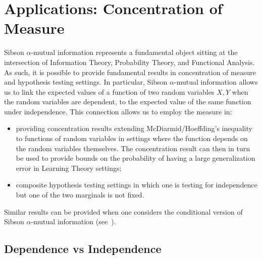 \documentclass{article}
\numberwithin{theorem}{section}
\numberwithin{example}{section}
\numberwithin{remark}{section}
\numberwithin{definition}{section}
\begin{document}
\section{Applications: Concentration of Measure}\label{sec:concentration}
Sibson $\alpha$-mutual information represents a fundamental object sitting at the intersection of Information Theory, Probability Theory, and Functional Analysis. As such, it is possible to provide fundamental results in concentration of measure and hypothesis testing settings. In particular, Sibson $\alpha$-mutual information allows us to link the expected values of a function of two random variables $X,Y$ when the random variables are dependent, to the expected value of the same function under independence. This connection allows us to employ the measure in:
\begin{itemize}
    \item providing concentration results extending McDiarmid/Hoeffding's inequality to functions of random variables in settings where the function depends on the random variables themselves. The concentration result can then in turn be used to provide bounds on the probability of having a large generalization error in Learning Theory settings;
    \item composite hypothesis testing settings in which one is testing for independence  but one of the two marginals is not fixed.
\end{itemize}
Similar results can be provided when one considers the conditional version of Sibson $\alpha$-mutual information (see~).
\subsection{Dependence vs Independence}\label{sec:depVsIndep}
\end{document}
